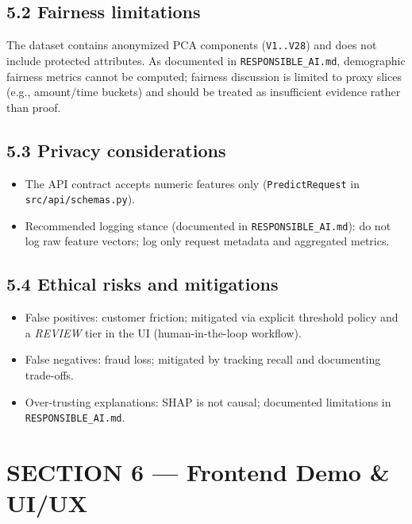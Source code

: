 \documentclass[11pt]{article}
\newcommand{\code}[1]{\texttt{#1}}
\begin{document}
\subsection*{5.2 Fairness limitations}
The dataset contains anonymized PCA components (\code{V1..V28}) and does not include protected attributes. As documented in \code{RESPONSIBLE\_AI.md}, demographic fairness metrics cannot be computed; fairness discussion is limited to proxy slices (e.g., amount/time buckets) and should be treated as insufficient evidence rather than proof.

\subsection*{5.3 Privacy considerations}
\begin{itemize}
  \item The API contract accepts numeric features only (\code{PredictRequest} in \code{src/api/schemas.py}).
  \item Recommended logging stance (documented in \code{RESPONSIBLE\_AI.md}): do not log raw feature vectors; log only request metadata and aggregated metrics.
\end{itemize}

\subsection*{5.4 Ethical risks and mitigations}
\begin{itemize}
  \item False positives: customer friction; mitigated via explicit threshold policy and a \emph{REVIEW} tier in the UI (human-in-the-loop workflow).
  \item False negatives: fraud loss; mitigated by tracking recall and documenting trade-offs.
  \item Over-trusting explanations: SHAP is not causal; documented limitations in \code{RESPONSIBLE\_AI.md}.
\end{itemize}

\section*{SECTION 6 — Frontend Demo \& UI/UX}
\end{document}
